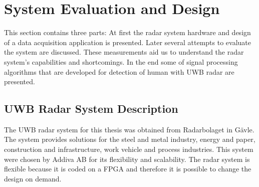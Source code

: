 \chapter{System Evaluation and Design}
This section contains three parts: At first the radar system hardware and design of a data acquisition application is presented. Later several attempts to evaluate the system are discussed. These measurements aid us to understand the radar system's capabilities and shortcomings. In the end some of signal processing algorithms that are developed for detection of human with UWB radar are presented.
\section{UWB Radar System Description}
The UWB radar system for this thesis was obtained from Radarbolaget in Gävle. The system provides solutions for the steel and metal industry, energy and paper, construction and infrastructure, work vehicle and process industries. This system were chosen by Addiva AB for its flexibility and scalability. The radar system is flexible because it is coded on a FPGA and therefore it is possible to change the design on demand. 
